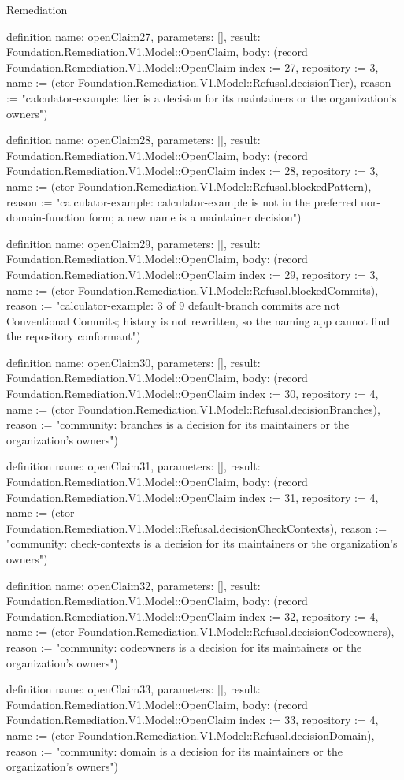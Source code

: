 \begin{lexlean}{Remediation}
\begin{semanticmodule}
definition{
  name: openClaim27,
  parameters: [],
  result: Foundation.Remediation.V1.Model::OpenClaim,
  body: (record Foundation.Remediation.V1.Model::OpenClaim {index := 27, repository := 3, name := (ctor Foundation.Remediation.V1.Model::Refusal.decisionTier), reason := "calculator-example: tier is a decision for its maintainers or the organization's owners"})
}

definition{
  name: openClaim28,
  parameters: [],
  result: Foundation.Remediation.V1.Model::OpenClaim,
  body: (record Foundation.Remediation.V1.Model::OpenClaim {index := 28, repository := 3, name := (ctor Foundation.Remediation.V1.Model::Refusal.blockedPattern), reason := "calculator-example: calculator-example is not in the preferred uor-{domain}-{function} form; a new name is a maintainer decision"})
}

definition{
  name: openClaim29,
  parameters: [],
  result: Foundation.Remediation.V1.Model::OpenClaim,
  body: (record Foundation.Remediation.V1.Model::OpenClaim {index := 29, repository := 3, name := (ctor Foundation.Remediation.V1.Model::Refusal.blockedCommits), reason := "calculator-example: 3 of 9 default-branch commits are not Conventional Commits; history is not rewritten, so the naming app cannot find the repository conformant"})
}

definition{
  name: openClaim30,
  parameters: [],
  result: Foundation.Remediation.V1.Model::OpenClaim,
  body: (record Foundation.Remediation.V1.Model::OpenClaim {index := 30, repository := 4, name := (ctor Foundation.Remediation.V1.Model::Refusal.decisionBranches), reason := "community: branches is a decision for its maintainers or the organization's owners"})
}

definition{
  name: openClaim31,
  parameters: [],
  result: Foundation.Remediation.V1.Model::OpenClaim,
  body: (record Foundation.Remediation.V1.Model::OpenClaim {index := 31, repository := 4, name := (ctor Foundation.Remediation.V1.Model::Refusal.decisionCheckContexts), reason := "community: check-contexts is a decision for its maintainers or the organization's owners"})
}

definition{
  name: openClaim32,
  parameters: [],
  result: Foundation.Remediation.V1.Model::OpenClaim,
  body: (record Foundation.Remediation.V1.Model::OpenClaim {index := 32, repository := 4, name := (ctor Foundation.Remediation.V1.Model::Refusal.decisionCodeowners), reason := "community: codeowners is a decision for its maintainers or the organization's owners"})
}

definition{
  name: openClaim33,
  parameters: [],
  result: Foundation.Remediation.V1.Model::OpenClaim,
  body: (record Foundation.Remediation.V1.Model::OpenClaim {index := 33, repository := 4, name := (ctor Foundation.Remediation.V1.Model::Refusal.decisionDomain), reason := "community: domain is a decision for its maintainers or the organization's owners"})
}


\end{semanticmodule}
\end{lexlean}
